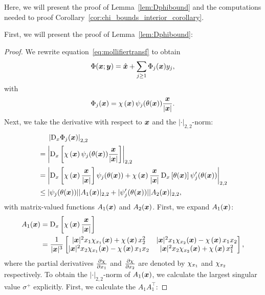 Here, we will present the proof of Lemma~\ref{lem:Dphibound} and the computations needed to proof Corollary~\ref{cor:chi_bounds_interior_corollary}.

First, we will present the proof of Lemma~\ref{lem:Dphibound}:
\begin{proof}
    We rewrite equation~\eqref{eq:mollifiertransf} to obtain
    \begin{equation*}
        \Phi({{\bm{x}}};\bm{y})=\hat{\bm{x}} + \sum_{j \geq 1} \Phi_j({{\bm{x}}})y_j,
    \end{equation*}
    with
    \begin{equation*}
        \Phi_j({{\bm{x}}}) = \chi\left({{\bm{x}}}\right)  \psi_j(\theta({{\bm{x}}})) \frac{{{\bm{x}}}}{|{{\bm{x}}}|}.
    \end{equation*}
    Next, we take the derivative with respect to ${{\bm{x}}}$ and the $|\cdot|_{2,2}$-norm:
    \begin{align}
        &\quad\,\,\left| \mathop{}\!\mathrm{D}_x \Phi_j({{\bm{x}}}) \right|_{2,2} \\
        &= \left| \mathop{}\!\mathrm{D}_x \left[\chi\left({{\bm{x}}}\right)  \psi_j(\theta({{\bm{x}}})) \frac{{{\bm{x}}}}{|{{\bm{x}}}|} \right] \right|_{2,2}\nonumber\\
        &=\left|  \mathop{}\!\mathrm{D}_x\left[ \chi\left({{\bm{x}}}\right) \frac{{{\bm{x}}}}{|{{\bm{x}}}|} \right] \psi_j(\theta({{\bm{x}}}))  +
        \chi\left({{\bm{x}}}\right) \frac{{{\bm{x}}}}{|{{\bm{x}}}|} \mathop{}\!\mathrm{D}_x\left[\theta({{\bm{x}}}) \right]  \psi_j'(\theta({{\bm{x}}})) \right|_{2,2}\nonumber \\
        &\leq| \psi_j(\theta({{\bm{x}}})) ||  A_1({{\bm{x}}}) |_{2,2}  +
        |  \psi_j'(\theta({{\bm{x}}}))  || A_2({{\bm{x}}})|_{2,2}, \label{eq:derbound}
    \end{align}
    with matrix-valued functions $A_1({{\bm{x}}})$ and $A_2({{\bm{x}}})$.
    First, we expand $A_1({{\bm{x}}})$:
    \begin{align*}
        A_1({{\bm{x}}}) &= \mathop{}\!\mathrm{D}_x\left[ \chi\left({{\bm{x}}}\right) \frac{{{\bm{x}}}}{|{{\bm{x}}}|} \right] \\
        &=  \frac{1}{|{{\bm{x}}}|^3}\begin{bmatrix} |{{\bm{x}}}|^2{x}_1\chi_{x_1}({{\bm{x}}})+\chi\left({{\bm{x}}}\right)  {x}_2^2  & |{{\bm{x}}}|^2{x}_1\chi_{x_2}({{\bm{x}}})-\chi\left({{\bm{x}}}\right) {x}_1{x}_2 \\ |{{\bm{x}}}|^2{x}_2\chi_{x_1}({{\bm{x}}}) -\chi\left({{\bm{x}}}\right) {x}_1{x}_2& |{{\bm{x}}}|^2{x}_2\chi_{x_2}({{\bm{x}}})+\chi\left({{\bm{x}}}\right) {x}_1^2 \end{bmatrix}	,
    \end{align*}
    where the partial derivatives $\frac{\partial \chi}{\partial {x}_1}$ and $\frac{\partial \chi}{\partial {x}_2}$ are denoted by $\chi_{{x}_1}$ and  $\chi_{{x}_2}$ respectively.
    To obtain the $|\cdot|_{2,2}$-norm of $A_1({{\bm{x}}})$, we calculate the largest singular value $\sigma^+$ explicitly.
    First, we calculate the $A_1 A_1^\top$:

\end{proof}

